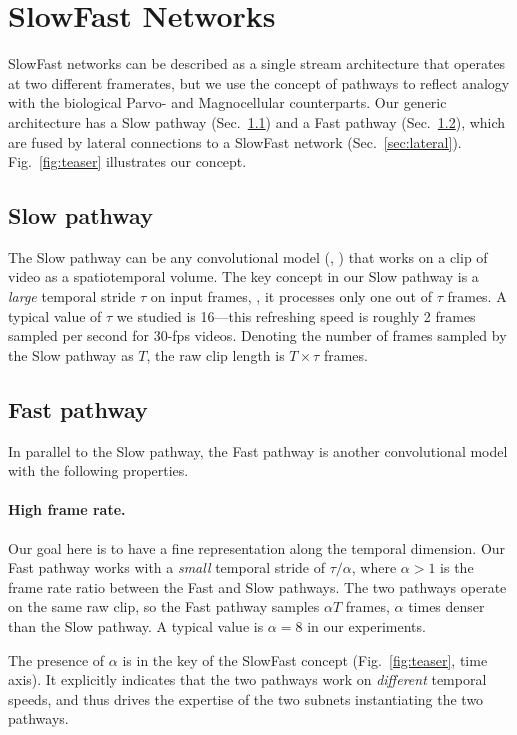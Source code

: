 \documentclass[10pt,twocolumn,letterpaper]{article}
\newcommand{\figref}[1]{Fig.~\ref{#1}}
\newcommand{\sref}[1]{Sec.~\ref{#1}}
\newcommand{\rw}[1]{{#1}}  %
\renewcommand{\omega}{\alpha}
\begin{document}
	\section{SlowFast Networks}  \label{sec:slow_fast}
	\rw{SlowFast networks can be described as a single stream architecture that operates at two different framerates, but we use the concept of pathways to reflect analogy with the biological Parvo- and Magnocellular counterparts.}
	Our generic architecture has a Slow pathway (\sref{sec:slow}) and a Fast pathway (\sref{sec:fast}), which are fused by lateral connections to a SlowFast network (\sref{sec:lateral}). \figref{fig:teaser} illustrates our concept.
	
	\subsection{Slow pathway} \label{sec:slow}
	
	The Slow pathway can be any convolutional model (\eg, \cite{Feichtenhofer2016a,Tran2015,Carreira2017,Wang2018}) that works on a clip of video as a spatiotemporal volume.
	The key concept in our Slow pathway is a \emph{large} temporal stride $\tau$ on input frames, \ie, it processes only one out of $\tau$ frames.  
	A typical value of $\tau$ we studied is 16---this refreshing speed is roughly 2 frames sampled per second for 30-fps videos.
	Denoting the number of frames sampled by the Slow pathway as $T$, the raw clip length is $T\times\tau$ frames.
	
	\subsection{Fast pathway} \label{sec:fast}
	In parallel to the Slow pathway, the Fast pathway is another convolutional model with the following properties.
	
	\paragraph{High frame rate.}
	Our goal here is to have a fine representation along the temporal dimension. 
	Our Fast pathway works with a \emph{small} temporal stride of $\tau / \omega$, where $\omega > 1$ is the frame rate ratio between the Fast and Slow pathways.
	The two pathways operate on the same raw clip, so the Fast pathway samples $\omega T$ frames, $\omega$ times denser than the Slow pathway. A typical value is $\omega=8$ in our experiments.
	
	The presence of $\omega$ is in the key of the SlowFast concept (\figref{fig:teaser}, time axis). It explicitly indicates that the two pathways work on \emph{different} temporal speeds, and thus drives the expertise of the two subnets instantiating the two pathways. 
	
\end{document}
